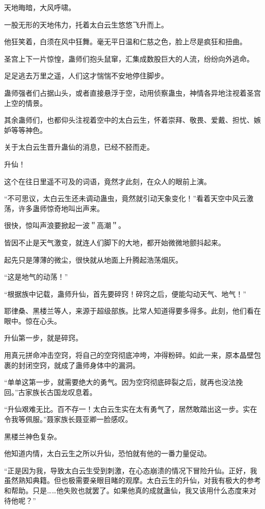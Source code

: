 
\begin{this_body}

天地晦暗，大风呼啸。

一股无形的天地伟力，托着太白云生悠悠飞升而上。

他狂笑着，白须在风中狂舞。毫无平日温和仁慈之色，脸上尽是疯狂和扭曲。

圣宫上下一片惊惶，蛊师们抱头鼠窜，汇集成数股巨大的人流，纷纷向外逃命。

足足逃去万里之遥，人们这才惴惴不安地停住脚步。

蛊师强者们占据山头，或者直接悬浮于空，动用侦察蛊虫，神情各异地注视着圣宫上空的情景。

其余蛊师们，也都仰头注视着空中的太白云生，怀着崇拜、敬畏、爱戴、担忧、嫉妒等等神色。

关于太白云生晋升蛊仙的消息，已经不胫而走。

升仙！

这个在往日里遥不可及的词语，竟然才此刻，在众人的眼前上演。

“不可思议，太白云生还未调动蛊虫，竟然就引动天象变化！”看着天空中风云激荡，许多蛊师惊奇地叫出声来。

很快，惊叫声浪要掀起一波＂高潮＂。

皆因不止是天气激变，就连人们脚下的大地，都开始微微地颤抖起来。

起先只是薄薄的微尘，很快就从地面上升腾起浩荡烟灰。

“这是地气的动荡！”

“根据族中记载，蛊师升仙，首先要碎窍！碎窍之后，便能勾动天气、地气！”

耶律桑、黑楼兰等人，来源于超级部族。比常人知道得要多得多。此刻，他们看在眼中。惊在心头。

升仙第一步，就是碎窍。

用真元拼命冲击空窍，将自己的空窍彻底冲垮，冲得粉碎。如此一来，原本晶壁包裹的封闭空窍，就成了蛊师身体中的漏洞。

“单单这第一步，就需要绝大的勇气。因为空窍彻底碎裂之后，就再也没法挽回。”古家族长古国龙叹息着。

“升仙艰难无比。百不存一！太白云生实在太有勇气了，居然敢踏出这一步。实在令我等佩服。”聂家族长聂亚卿一脸感叹。

黑楼兰神色复杂。

他知道内情，太白云生之所以升仙，恐怕就有他的一番力量促动。

“正是因为我，导致太白云生受到刺激，在心态崩溃的情况下冒险升仙。正好，我虽然熟知典籍。但也极需要亲眼目睹的观摩。太白云生的升仙，对我有极大的参考和帮助。只是……他失败也就罢了。如果他真的成就蛊仙，我又该用什么态度来对待他呢？”


\end{this_body}
